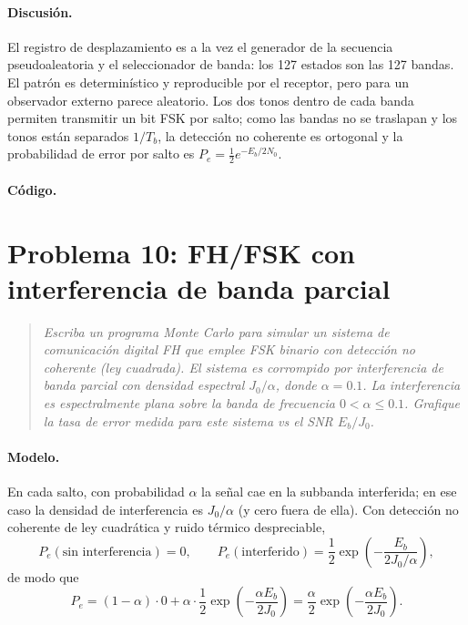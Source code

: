 \documentclass[11pt,a4paper]{article}
\newcommand{\listado}[1]{%
  \VerbatimInput[fontsize=\scriptsize,breaklines=true,breakanywhere=true,
    frame=single,framesep=2pt,rulecolor=\color{gray!50},numbers=left,
    numbersep=4pt]{#1}}
\begin{document}
\paragraph{Discusión.} El registro de desplazamiento es a la vez el generador de
la secuencia pseudoaleatoria y el seleccionador de banda: los 127 estados son
las 127 bandas. El patrón es determinístico y reproducible por el receptor, pero
para un observador externo parece aleatorio. Los dos tonos dentro de cada banda
permiten transmitir un bit FSK por salto; como las bandas no se traslapan y los
tonos están separados $1/T_b$, la detección no coherente es ortogonal y la
probabilidad de error por salto es $P_e=\tfrac12 e^{-E_b/2N_0}$.

\paragraph{Código.}
\listado{problema09.m}

\section{Problema 10: FH/FSK con interferencia de banda parcial}

\begin{quote}
\itshape
Escriba un programa Monte Carlo para simular un sistema de comunicación digital
FH que emplee FSK binario con detección no coherente (ley cuadrada). El sistema
es corrompido por interferencia de banda parcial con densidad espectral $J_0/\alpha$,
donde $\alpha=0.1$. La interferencia es espectralmente plana sobre la banda de
frecuencia $0<\alpha\le0.1$. Grafique la tasa de error medida para este sistema
vs el SNR $E_b/J_0$.
\end{quote}

\paragraph{Modelo.} En cada salto, con probabilidad $\alpha$ la señal cae en la
subbanda interferida; en ese caso la densidad de interferencia es $J_0/\alpha$
(y cero fuera de ella). Con detección no coherente de ley cuadrática y ruido
térmico despreciable,
\begin{equation}
  P_e(\text{sin interferencia})=0,\qquad
  P_e(\text{interferido})=\frac12\exp\!\left(-\frac{E_b}{2J_0/\alpha}\right),
\end{equation}
de modo que
\begin{equation}
  P_e=(1-\alpha)\cdot0+\alpha\cdot\frac12
  \exp\!\left(-\frac{\alpha E_b}{2J_0}\right)
  =\frac{\alpha}{2}\exp\!\left(-\frac{\alpha E_b}{2J_0}\right).
\end{equation}
\end{document}

